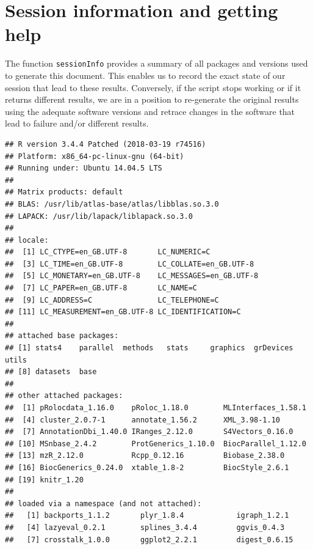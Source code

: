 \section*{Session information and getting help}

The function \texttt{sessionInfo} provides a summary of all packages
and versions used to generate this document. This enables us to record
the exact state of our session that lead to these results. Conversely,
if the script stops working or if it returns different results, we are
in a position to re-generate the original results using the adequate
software versions and retrace changes in the software that lead to
failure and/or different results.

\begin{knitrout}
\color{fgcolor}\begin{kframe}
\begin{alltt}
\hlstd{()}
\end{alltt}
\begin{verbatim}
## R version 3.4.4 Patched (2018-03-19 r74516)
## Platform: x86_64-pc-linux-gnu (64-bit)
## Running under: Ubuntu 14.04.5 LTS
## 
## Matrix products: default
## BLAS: /usr/lib/atlas-base/atlas/libblas.so.3.0
## LAPACK: /usr/lib/lapack/liblapack.so.3.0
## 
## locale:
##  [1] LC_CTYPE=en_GB.UTF-8       LC_NUMERIC=C              
##  [3] LC_TIME=en_GB.UTF-8        LC_COLLATE=en_GB.UTF-8    
##  [5] LC_MONETARY=en_GB.UTF-8    LC_MESSAGES=en_GB.UTF-8   
##  [7] LC_PAPER=en_GB.UTF-8       LC_NAME=C                 
##  [9] LC_ADDRESS=C               LC_TELEPHONE=C            
## [11] LC_MEASUREMENT=en_GB.UTF-8 LC_IDENTIFICATION=C       
## 
## attached base packages:
## [1] stats4    parallel  methods   stats     graphics  grDevices utils    
## [8] datasets  base     
## 
## other attached packages:
##  [1] pRolocdata_1.16.0    pRoloc_1.18.0        MLInterfaces_1.58.1 
##  [4] cluster_2.0.7-1      annotate_1.56.2      XML_3.98-1.10       
##  [7] AnnotationDbi_1.40.0 IRanges_2.12.0       S4Vectors_0.16.0    
## [10] MSnbase_2.4.2        ProtGenerics_1.10.0  BiocParallel_1.12.0 
## [13] mzR_2.12.0           Rcpp_0.12.16         Biobase_2.38.0      
## [16] BiocGenerics_0.24.0  xtable_1.8-2         BiocStyle_2.6.1     
## [19] knitr_1.20          
## 
## loaded via a namespace (and not attached):
##   [1] backports_1.1.2       plyr_1.8.4            igraph_1.2.1         
##   [4] lazyeval_0.2.1        splines_3.4.4         ggvis_0.4.3          
##   [7] crosstalk_1.0.0       ggplot2_2.2.1         digest_0.6.15        

\end{verbatim}
\end{kframe}
\end{knitrout}
